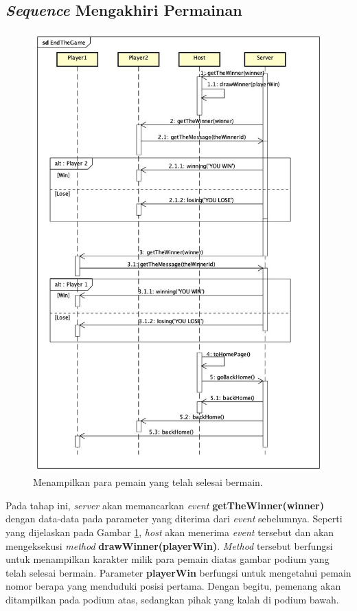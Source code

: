 \subsection{\textit{Sequence} Mengakhiri Permainan}
\begin{figure}[H]
	\centering
	\includegraphics[scale=0.33]{Gambar/WinningPage_2}
	\caption{Menampilkan para pemain yang telah selesai bermain.}
	\label{fig:4_WinningPage}
\end{figure}

Pada tahap ini, \textit{server} akan memancarkan \textit{event} \textbf{getTheWinner(winner)} dengan data-data pada parameter yang diterima dari \textit{event} sebelumnya. Seperti yang dijelaskan pada Gambar \ref{fig:4_WinningPage}, \textit{host} akan menerima \textit{event} tersebut dan akan mengeksekusi \textit{method} \textbf{drawWinner(playerWin)}. \textit{Method} tersebut berfungsi untuk menampilkan karakter milik para pemain diatas gambar podium yang telah selesai bermain. Parameter \textbf{playerWin} berfungsi untuk mengetahui pemain nomor berapa yang menduduki posisi pertama. Dengan begitu, pemenang akan ditampilkan pada podium atas, sedangkan pihak yang kalah di podium bawah.

